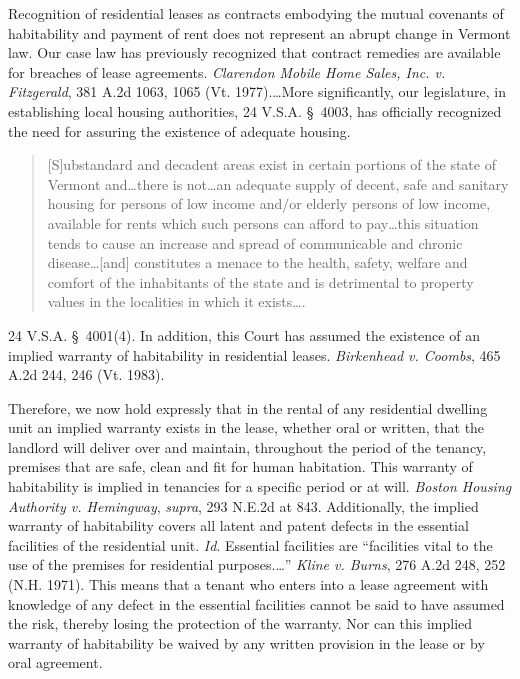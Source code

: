 Recognition of residential leases as contracts embodying the mutual covenants of
habitability and payment of rent does not represent an abrupt change in Vermont
law. Our case law has previously recognized that contract remedies are
available for breaches of lease agreements. \textit{Clarendon Mobile Home
Sales, Inc. v. Fitzgerald}, 381 A.2d 1063, 1065 (Vt. 1977).\ldots More
significantly, our legislature, in establishing local housing authorities, 24
V.S.A. \S~4003, has officially recognized the need for assuring the existence
of adequate housing.  
\begin{quote}
[S]ubstandard and decadent areas exist in certain portions of the state of
Vermont and\ldots there is not\ldots an adequate supply of decent, safe and
sanitary housing for persons of low income and/or elderly persons of low
income, available for rents which such persons can afford to pay\ldots this
situation tends to cause an increase and spread of communicable and chronic
disease\ldots [and] constitutes a menace to the health, safety, welfare and
comfort of the inhabitants of the state and is detrimental to property values
in the localities in which it exists\ldots .  
\end{quote}
24 V.S.A. \S~4001(4). In addition, this Court has assumed the existence of an
implied warranty of habitability in residential leases. \textit{Birkenhead v.
Coombs}, 465 A.2d 244, 246 (Vt. 1983).

Therefore, we now hold expressly that in the rental of any residential dwelling
unit an implied warranty exists in the lease, whether oral or written, that the
landlord will deliver over and maintain, throughout the period of the tenancy,
premises that are safe, clean and fit for human habitation. This warranty of
habitability is implied in tenancies for a specific period or at will.
\textit{Boston Housing Authority v. Hemingway}, \textit{supra}, 293 N.E.2d at
843. Additionally, the implied warranty of habitability covers all latent and
patent defects in the essential facilities of the residential unit.
\textit{Id}. Essential facilities are ``facilities vital to the use of the
premises for residential purposes.\ldots'' \textit{Kline v. Burns}, 276 A.2d
248, 252 (N.H. 1971). This means that a tenant who enters into a lease
agreement with knowledge of any defect in the essential facilities cannot be
said to have assumed the risk, thereby losing the protection of the warranty.
Nor can this implied warranty of habitability be waived by any written
provision in the lease or by oral agreement.

